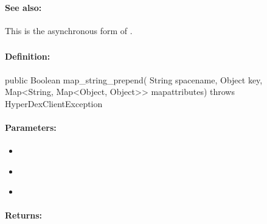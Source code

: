 \paragraph{See also:}  This is the asynchronous form of .

\pagebreak
\subsubsection{}
\label{api:java:map_string_prepend}


\paragraph{Definition:}
\begin{javacode}
public Boolean map_string_prepend(
        String spacename,
        Object key,
        Map<String, Map<Object, Object>> mapattributes) throws HyperDexClientException
\end{javacode}

\paragraph{Parameters:}
\begin{itemize}[noitemsep]
\item {}\\

\item {}\\

\item {}\\

\end{itemize}

\paragraph{Returns:}


\pagebreak
\subsubsection{}
\label{api:java:async_map_string_prepend}


